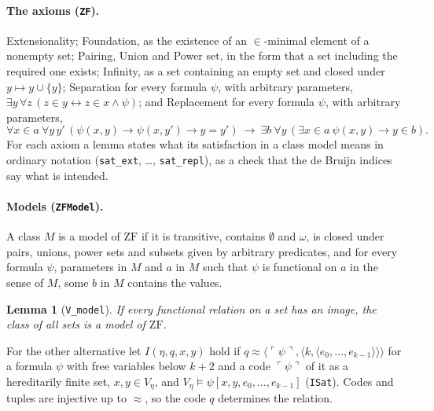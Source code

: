 \documentclass[10pt]{article}
\newtheorem{lemma}[theorem]{Lemma}
\theoremstyle{definition}
\theoremstyle{remark}
\newcommand{\ZF}{\mathrm{ZF}}
\newcommand{\lean}[1]{\texttt{#1}}
\begin{document}
\paragraph{The axioms (\lean{ZF}).}
Extensionality; Foundation, as the existence of an $\in$-minimal element
of a nonempty set; Pairing, Union and Power set, in the form that a
set including the required one exists; Infinity, as a set containing an
empty set and closed under $y\mapsto y\cup\{y\}$; Separation for every formula
$\psi$, with arbitrary parameters,
$\exists y\,\forall z\,(z\in y\leftrightarrow z\in x\wedge\psi)$; and Replacement for every
formula $\psi$, with arbitrary parameters,
\[\forall x{\in}a\ \forall y\,y'\,(\psi(x,y)\to\psi(x,y')\to y=y')\ \to\ \exists b\ \forall y\,
  (\exists x{\in}a\ \psi(x,y)\to y\in b).\]
For each axiom a lemma states what its satisfaction in a class model
means in ordinary notation (\lean{sat\_ext}, \dots, \lean{sat\_repl}),
as a check that the de Bruijn indices say what is intended.

\paragraph{Models (\lean{ZFModel}).}
A class $M$ is a model of $\ZF$ if it is transitive, contains $\emptyset$ and
$\omega$, is closed under pairs, unions, power sets and subsets given by
arbitrary predicates, and for every formula $\psi$, parameters in $M$ and
$a$ in $M$ such that $\psi$ is functional on $a$ in the sense of $M$, some
$b$ in $M$ contains the values.

\begin{lemma}[\lean{V\_model}]
If every functional relation on a set has an image, the class of all
sets is a model of $\ZF$.
\end{lemma}

For the other alternative let $I(\eta,q,x,y)$ hold if $q\approx\langle\ulcorner\psi\urcorner,
\langle k,\langle e_0,\dots,e_{k-1}\rangle\rangle\rangle$ for a formula $\psi$ with free variables
below $k+2$ and a code $\ulcorner\psi\urcorner$ of it as a hereditarily finite set,
$x,y\in V_\eta$, and $V_\eta\models\psi[x,y,e_0,\dots,e_{k-1}]$ (\lean{ISat}). Codes and
tuples are injective up to $\approx$, so the code $q$ determines the
relation.
\end{document}
